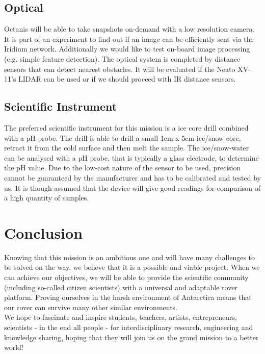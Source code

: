 \documentclass[a4paper,12pt]{article}
\begin{document}
\subsection{Optical}
Octanis will be able to take snapshots on-demand with a low resolution camera. It is part of an experiment to find out if an image can be efficiently sent via the Iridium network. Additionally we would like to test on-board image processing (e.g. simple feature detection). The optical system is completed by distance sensors that can detect nearest obstacles. It will be evaluated if the Neato XV-11's LIDAR \cite{lidar} can be used or if we should proceed with IR distance sensors.


\subsection{Scientific Instrument}
The preferred scientific instrument for this mission is a ice core drill combined with a pH probe. The drill is able to drill a small 1cm x 5cm ice/snow core, retract it from the cold surface and then melt the sample. The ice/snow-water can be analysed with a pH probe, that is typically a glass electrode, to determine the pH value. Due to the low-cost nature of the sensor to be used, precision cannot be guaranteed by the manufacturer and has to be calibrated and tested by us. It is though assumed that the device will give good readings for comparison of a high quantity of samples.

\pagebreak

\section{Conclusion}
Knowing that this mission is an ambitious one and will have many challenges to be solved on the way, we believe that it is a possible and viable project. When we can achieve our objectives, we will be able to provide the scientific community (including so-called citizen scientists) with a universal and adaptable rover platform. Proving ourselves in the harsh environment of Antarctica means that our rover can survive many other similar environments. \\

We hope to fascinate and inspire students, teachers, artists, entrepreneurs, scientists - in the end all people - for interdisciplinary research, engineering and knowledge sharing, hoping that they will join us on the grand mission to a better world!
\end{document}
